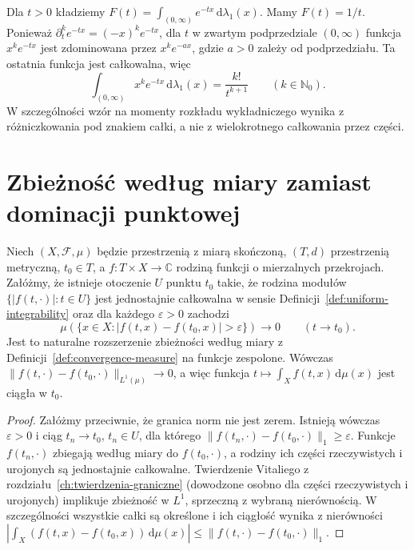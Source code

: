 \begin{przyklad}
\label{ex:laplace-11}
Dla $t>0$ kładziemy $F(t)=\int_{(0,\infty)}e^{-tx}\,\mathrm d\lambda_1(x)$.
Mamy $F(t)=1/t$. Ponieważ
$\partial_t^k e^{-tx}=(-x)^k e^{-tx}$, dla
$t$ w zwartym podprzedziale $(0,\infty)$ funkcja
$x^k e^{-tx}$ jest zdominowana przez
$x^ke^{-ax}$, gdzie $a>0$ zależy od podprzedziału.
Ta ostatnia funkcja jest całkowalna, więc
\[
\int_{(0,\infty)}x^ke^{-tx}\,\mathrm d\lambda_1(x)
=\frac{k!}{t^{k+1}}\qquad(k\in\mathbb N_0).
\]
W szczególności wzór na momenty rozkładu wykładniczego
wynika z różniczkowania pod znakiem całki, a nie z
wielokrotnego całkowania przez części.
\end{przyklad}

\section{Zbieżność według miary zamiast dominacji punktowej}

\begin{twierdzenie}
\label{thm:param-vitali-11}
Niech $(X,\mathcal F,\mu)$ będzie przestrzenią z miarą
skończoną, $(T,d)$ przestrzenią metryczną, $t_0\in T$,
a $f:T\times X\to\mathbb C$ rodziną funkcji o mierzalnych
przekrojach. Załóżmy, że istnieje otoczenie $U$ punktu
$t_0$ takie, że rodzina modułów
$\{|f(t,\cdot)|:t\in U\}$ jest jednostajnie całkowalna
w sensie Definicji~\ref{def:uniform-integrability}
oraz dla każdego $\varepsilon>0$ zachodzi
\[
\mu(\{x\in X:|f(t,x)-f(t_0,x)|>\varepsilon\})
\longrightarrow0\qquad(t\to t_0).
\]
Jest to naturalne rozszerzenie zbieżności według miary
z Definicji~\ref{def:convergence-measure} na funkcje
zespolone. Wówczas
$\|f(t,\cdot)-f(t_0,\cdot)\|_{L^1(\mu)}\to0$,
a więc funkcja $t\mapsto\int_X f(t,x)\,\mathrm d\mu(x)$
jest ciągła w $t_0$.
\end{twierdzenie}
\begin{proof}
Załóżmy przeciwnie, że granica norm nie jest zerem.
Istnieją wówczas $\varepsilon>0$ i ciąg $t_n\to t_0$,
$t_n\in U$, dla którego
$\|f(t_n,\cdot)-f(t_0,\cdot)\|_1\ge\varepsilon$.
Funkcje $f(t_n,\cdot)$ zbiegają według miary do
$f(t_0,\cdot)$, a rodziny ich części rzeczywistych i urojonych
są jednostajnie całkowalne. Twierdzenie Vitaliego
z rozdziału~\ref{ch:twierdzenia-graniczne}
(dowodzone osobno dla części rzeczywistych i urojonych)
implikuje zbieżność w $L^1$, sprzeczną z wybraną
nierównością. W szczególności wszystkie całki
są określone i ich ciągłość wynika z nierówności
$|\int_X(f(t,x)-f(t_0,x))\,\mathrm d\mu(x)|
\le\|f(t,\cdot)-f(t_0,\cdot)\|_1$.
\end{proof}

